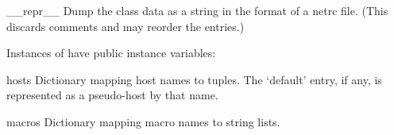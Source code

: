 \begin{methoddesc}{__repr__}{}
Dump the class data as a string in the format of a netrc file.
(This discards comments and may reorder the entries.)
\end{methoddesc}

Instances of  have public instance variables:

\begin{memberdesc}{hosts}
Dictionary mapping host names to  tuples.  The `default' entry, if any, is represented
as a pseudo-host by that name.
\end{memberdesc}

\begin{memberdesc}{macros}
Dictionary mapping macro names to string lists.
\end{memberdesc}
